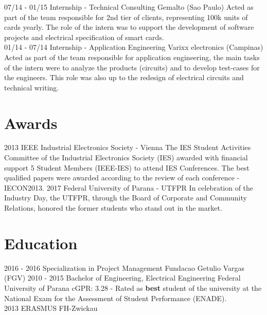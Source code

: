 \documentclass[]{friggeri-cv}
\begin{document}
\begin{entrylist}
    \entry
    {07/14 - 01/15}
    {Internship - Technical Consulting}
    {\normalsize{Gemalto (Sao Paulo)}}
    {Acted as part of the team responsible for 2nd tier of clients, representing 100k units of cards yearly. The role of the intern was to support the development of software projects and electrical specification of smart cards. \\}
    \entry
    {01/14 - 07/14}
    {Internship - Application Engineering}
    {\normalsize{Varixx electronics (Campinas)}}
    {Acted as part of the team responsible for application engineering, the main tasks of the intern were to analyze the products (circuits) and to develop test-cases for the engineers. This role was also up to the redesign of electrical circuits and technical writing.}
\end{entrylist}

\section{Awards}
\begin{entrylist}
 
  \entry
    {2013}
    {IEEE Industrial Electronics Society - Vienna}
    {}
    {The IES Student Activities Committee of the Industrial Electronics Society (IES) awarded with financial support 5 Student Members (IEEE-IES) to attend IES Conferences. The best qualified papers were awarded according to the review of each conference - IECON2013.}
    \entry
    {2017}
    {Federal University of Parana - UTFPR}
    {}
    {In celebration of the Industry Day, the UTFPR, through the Board of Corporate and Community Relations, honored the former students who stand out in the market.}
\end{entrylist}

\section{Education}
\begin{entrylist}
  \entry
    {2016 - 2016}
    {Specialization in Project Management}
    {Fundacao Getulio Vargas (FGV)}
    {}
  \entry
    {2010 - 2015}
    {Bachelor of Engineering, Electrical Engineering}
    {Federal University of Parana}
    {cGPR: 3.28 - Rated as \textbf{best} student of the university at the National Exam for the Assessment of Student Performance (ENADE). \\}
  \entry
    {2013}
    {ERASMUS}
    {FH-Zwickau}
    {%
    }
\end{entrylist}
\end{document}

